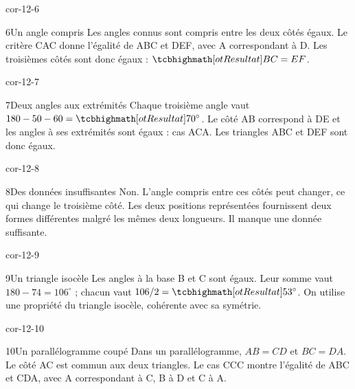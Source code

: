 \begin{blocLivre}{cor-12-6}\begin{corrige}{6}{Un angle compris}
Les angles connus sont compris entre les deux côtés égaux. Le critère CAC donne l’égalité de ABC et DEF, avec A correspondant à D. Les troisièmes côtés sont donc égaux : $\res{BC=EF}$.
\label{fig-cor-12-6}
\end{corrige}\end{blocLivre}
\begin{blocLivre}{cor-12-7}\begin{corrige}{7}{Deux angles aux extrémités}
Chaque troisième angle vaut $180-50-60=\res{70^\circ}$. Le côté AB correspond à DE et les angles à ses extrémités sont égaux : cas ACA. Les triangles ABC et DEF sont donc égaux.
\label{fig-cor-12-7}
\end{corrige}\end{blocLivre}
\begin{blocLivre}{cor-12-8}\begin{corrige}{8}{Des données insuffisantes}
Non. L’angle compris entre ces côtés peut changer, ce qui change le troisième côté. Les deux positions représentées fournissent deux formes différentes malgré les mêmes deux longueurs. Il manque une donnée suffisante.
\label{fig-cor-12-8}
\end{corrige}\end{blocLivre}
\begin{blocLivre}{cor-12-9}\begin{corrige}{9}{Un triangle isocèle}
Les angles à la base B et C sont égaux. Leur somme vaut $180-74=106^\circ$ ; chacun vaut $106/2=\res{53^\circ}$. On utilise une propriété du triangle isocèle, cohérente avec sa symétrie.
\label{fig-cor-12-9}
\end{corrige}\end{blocLivre}
\begin{blocLivre}{cor-12-10}\begin{corrige}{10}{Un parallélogramme coupé}
Dans un parallélogramme, $AB=CD$ et $BC=DA$. Le côté AC est commun aux deux triangles. Le cas CCC montre l’égalité de ABC et CDA, avec A correspondant à C, B à D et C à A.
\label{fig-cor-12-10}
\end{corrige}\end{blocLivre}
